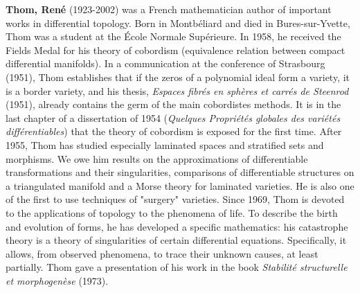 \textbf{Thom, René} (1923-2002) was a French mathematician author of important works in differential topology. Born in Montbéliard and died in Bures-sur-Yvette, Thom was a student at the École Normale Supérieure. In 1958, he received the Fields Medal for his theory of cobordism (equivalence relation between compact differential manifolds). In a communication at the conference of Strasbourg (1951), Thom establishes that if the zeros of a polynomial ideal form a variety, it is a border variety, and his thesis, \textit{Espaces fibrés en sphères et carrés de Steenrod }(1951), already contains the germ of the main cobordistes methods. It is in the last chapter of a dissertation of 1954 (\textit{Quelques Propriétés globales des variétés différentiables}) that the theory of cobordism is exposed for the first time. After 1955, Thom has studied especially laminated spaces and stratified sets and morphisms. We owe him results on the approximations of differentiable transformations and their singularities, comparisons of differentiable structures on a triangulated manifold and a Morse theory for laminated varieties. He is also one of the first to use techniques of "surgery" varieties. Since 1969, Thom is devoted to the applications of topology to the phenomena of life. To describe the birth and evolution of forms, he has developed a specific mathematics: his catastrophe theory is a theory of singularities of certain differential equations. Specifically, it allows, from observed phenomena, to trace their unknown causes, at least partially. Thom gave a presentation of his work in the book \textit{Stabilité structurelle et morphogenèse} (1973).

